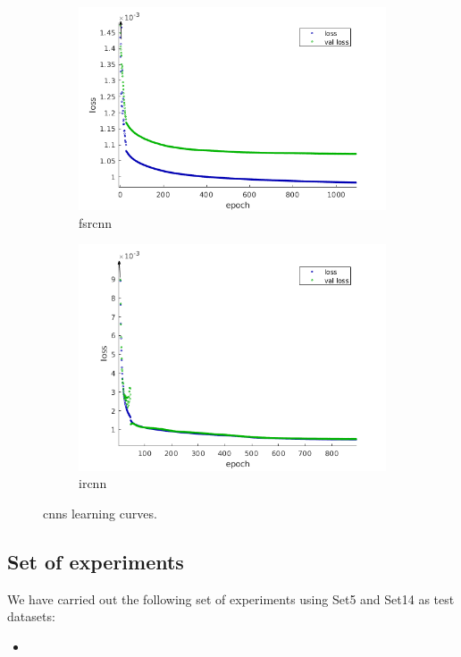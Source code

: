 \begin{figure}[h]
	\centering
	\begin{subfigure}{0.4\textwidth}
		\includegraphics[width=\textwidth]{images/fsrcnn_train.png}
		\caption{\gls{fsrcnn}}
	\end{subfigure}
	\begin{subfigure}{0.4\textwidth}
		\includegraphics[width=\textwidth]{images/ircnn_train.png}
		\caption{\gls{ircnn}}
	\end{subfigure}
	\caption{\glspl{cnn} learning curves.}
	\label{fig:training}
\end{figure}

\subsection{Set of experiments}
We have carried out the following set of experiments using Set5 \cite{SET5} and Set14 \cite{SET14} as test datasets:
\begin{itemize}
	\item 
\end{itemize}
